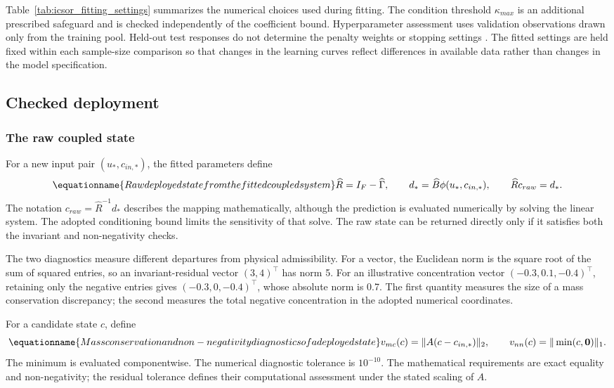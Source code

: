 Table~\ref{tab:icsor_fitting_settings} summarizes the numerical choices used during fitting. The condition threshold \(\kappa_{max}\) is an additional prescribed safeguard and is checked independently of the coefficient bound. Hyperparameter assessment uses validation observations drawn only from the training pool. Held-out test responses do not determine the penalty weights or stopping settings \citep{Kaufman2012}. The fitted settings are held fixed within each sample-size comparison so that changes in the learning curves reflect differences in available data rather than changes in the model specification.

\subsection{Checked deployment}

\subsubsection{The raw coupled state}

For a new input pair \((u_*,c_{in,*})\), the fitted parameters define
\begin{equation}
\equationname{Raw deployed state from the fitted coupled system}
\label{eq:icsor_raw_state}
\widehat R=I_F-\widehat\Gamma,
\qquad d_* =\widehat B\phi(u_*,c_{in,*}),
\qquad \widehat R c_{raw}=d_*.
\end{equation}
The notation \(c_{raw}=\widehat R^{-1}d_*\) describes the mapping mathematically, although the prediction is evaluated numerically by solving the linear system. The adopted conditioning bound limits the sensitivity of that solve. The raw state can be returned directly only if it satisfies both the invariant and non-negativity checks.

The two diagnostics measure different departures from physical admissibility. For a vector, the Euclidean norm is the square root of the sum of squared entries, so an invariant-residual vector \((3,4)^\top\) has norm 5. For an illustrative concentration vector \((-0.3,0.1,-0.4)^\top\), retaining only the negative entries gives \((-0.3,0,-0.4)^\top\), whose absolute norm is 0.7. The first quantity measures the size of a mass conservation discrepancy; the second measures the total negative concentration in the adopted numerical coordinates.

For a candidate state \(c\), define
\begin{equation}
\equationname{Mass conservation and non-negativity diagnostics of a deployed state}
\label{eq:icsor_deployment_diagnostics}
v_{mc}(c)=\|A(c-c_{in,*})\|_2,
\qquad
v_{nn}(c)=\|\min(c,\mathbf{0})\|_1.
\end{equation}
The minimum is evaluated componentwise. The numerical diagnostic tolerance is \(10^{-10}\). The mathematical requirements are exact equality and non-negativity; the residual tolerance defines their computational assessment under the stated scaling of \(A\).

